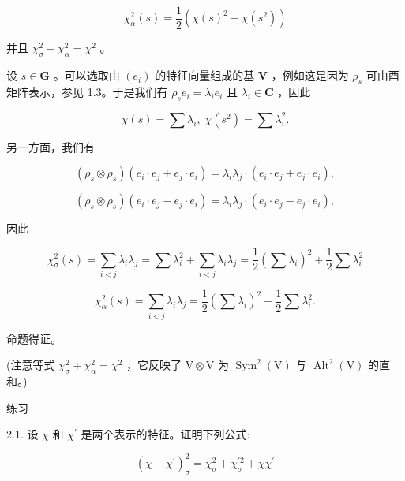 \documentclass[10pt]{article}
\begin{document}
\[
{\chi }_{\alpha }^{2}\left( s\right)  = \frac{1}{2}\left( {\chi {\left( s\right) }^{2} - \chi \left( {s}^{2}\right) }\right)
\]

并且 \({\chi }_{\sigma }^{2} + {\chi }_{\alpha }^{2} = {\chi }^{2}\) 。

设 \(s \in  \mathbf{G}\) 。可以选取由 \(\left( {e}_{i}\right)\) 的特征向量组成的基 \(\mathbf{V}\) ，例如这是因为 \({\rho }_{s}\) 可由酉矩阵表示，参见 1.3。于是我们有 \({\rho }_{s}{e}_{i} = {\lambda }_{i}{e}_{i}\) 且 \({\lambda }_{i} \in  \mathbf{C}\) ，因此

\[
\chi \left( s\right)  = \sum {\lambda }_{i},\;\chi \left( {s}^{2}\right)  = \sum {\lambda }_{i}^{2}.
\]

另一方面，我们有

\[
\left( {{\rho }_{s} \otimes  {\rho }_{s}}\right) \left( {{e}_{i} \cdot  {e}_{j} + {e}_{j} \cdot  {e}_{i}}\right)  = {\lambda }_{i}{\lambda }_{j} \cdot  \left( {{e}_{i} \cdot  {e}_{j} + {e}_{j} \cdot  {e}_{i}}\right) ,
\]

\[
\left( {{\rho }_{s} \otimes  {\rho }_{s}}\right) \left( {{e}_{i} \cdot  {e}_{j} - {e}_{j} \cdot  {e}_{i}}\right)  = {\lambda }_{i}{\lambda }_{j} \cdot  \left( {{e}_{i} \cdot  {e}_{j} - {e}_{j} \cdot  {e}_{i}}\right) ,
\]

因此

\[
{\chi }_{\sigma }^{2}\left( s\right)  = \mathop{\sum }\limits_{{i < j}}{\lambda }_{i}{\lambda }_{j} = \sum {\lambda }_{i}^{2} + \mathop{\sum }\limits_{{i < j}}{\lambda }_{i}{\lambda }_{j} = \frac{1}{2}{\left( \sum {\lambda }_{i}\right) }^{2} + \frac{1}{2}\sum {\lambda }_{i}^{2}
\]

\[
{\chi }_{\alpha }^{2}\left( s\right)  = \mathop{\sum }\limits_{{i < j}}{\lambda }_{i}{\lambda }_{j} = \frac{1}{2}{\left( \sum {\lambda }_{i}\right) }^{2} - \frac{1}{2}\sum {\lambda }_{i}^{2}.
\]

命题得证。

(注意等式 \({\chi }_{\sigma }^{2} + {\chi }_{\alpha }^{2} = {\chi }^{2}\) ，它反映了 \(\mathrm{V} \otimes  \mathrm{V}\) 为 \({\operatorname{Sym}}^{2}\left( \mathrm{V}\right)\) 与 \({\operatorname{Alt}}^{2}\left( \mathrm{V}\right)\) 的直和。)

练习

2.1. 设 \(\chi\) 和 \({\chi }^{\prime }\) 是两个表示的特征。证明下列公式:

\[
{\left( \chi  + {\chi }^{\prime }\right) }_{\sigma }^{2} = {\chi }_{\sigma }^{2} + {\chi }_{\sigma }^{\prime 2} + \chi {\chi }^{\prime }
\]
\end{document}
